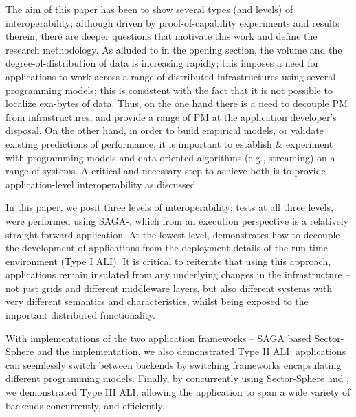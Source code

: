 \documentclass[3p,twocolumn]{elsarticle}
\begin{document}
The aim of this paper has been to show several types (and levels) of
interoperability; although driven by proof-of-capability experiments
and results therein, there are deeper questions that motivate this
work and define the research methodology.  As alluded to in the
opening section, the volume and the degree-of-distribution of data is
increasing rapidly; this imposes a need for applications to work
across a range of distributed infrastructures using several
programming models; this is consistent with the fact that it is not
possible to localize exa-bytes of data.  Thus, on the one hand there
is a need to decouple PM from infrastructures, and provide a range of
PM at the application developer's disposal. On the other hand, in
order to build empirical models, or validate existing predictions of
performance, it is important to establish \& experiment with
programming models and data-oriented algorithms (e.g., streaming) on a
range of systems. %
A critical and necessary step to achieve both is to provide
application-level interoperability as discussed.

In this paper, we posit three levels of interoperability; tests at all
three levels, were performed using SAGA-\mr, which from an execution
perspective is a relatively straight-forward application.  At the
lowest level, \sagamapreduce demonstrates how to decouple the
development of applications from the deployment details of the
run-time environment (Type I ALI).  It is critical to reiterate that
using this approach, applications remain insulated from any underlying
changes in the infrastructure -- not just grids and different
middleware layers, but also different systems with very different
semantics and characteristics, whilst being exposed to the important
distributed functionality.

With implementations of the two application frameworks -- SAGA based
Sector-Sphere and the \smr implementation, we also demonstrated Type
II ALI: applications can seemlessly switch between backends by
switching frameworks encapsulating different programming models.
Finally, by concurrently using Sector-Sphere \mr and \smr, we
demonstrated Type III ALI, allowing the application to span a wide
variety of backends concurrently, and efficiently.
\end{document}

